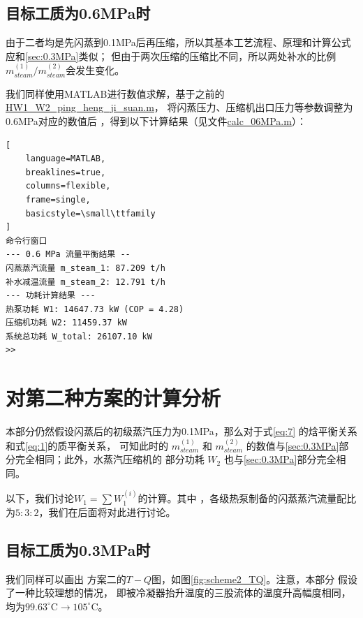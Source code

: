 \documentclass{thuemp}
\begin{document}
\subsection{目标工质为0.6MPa时}




由于二者均是先闪蒸到0.1MPa后再压缩，所以其基本工艺流程、原理和计算公式应和\ref{sec:0.3MPa}类似；
但由于两次压缩的压缩比不同，所以两处补水的比例
$m_{steam}^{(1)}/m_{steam}^{(2)}$会发生变化。

我们同样使用MATLAB进行数值求解，基于之前的\url{HW1_W2_ping_heng_ji_suan.m}，
将闪蒸压力、压缩机出口压力等参数调整为0.6MPa对应的数值后
，得到以下计算结果（见文件\url{calc_06MPa.m}）：
\begin{lstlisting}[
    language=MATLAB,
    breaklines=true,
    columns=flexible,
    frame=single,
    basicstyle=\small\ttfamily
]
命令行窗口
--- 0.6 MPa 流量平衡结果 --
闪蒸蒸汽流量 m_steam_1: 87.209 t/h
补水减温流量 m_steam_2: 12.791 t/h
--- 功耗计算结果 ---
热泵功耗 W1: 14647.73 kW (COP = 4.28)
压缩机功耗 W2: 11459.37 kW
系统总功耗 W_total: 26107.10 kW
>> 
\end{lstlisting}



\section{对第二种方案的计算分析}\label{sec:scheme2_analysis}


本部分仍然假设闪蒸后的初级蒸汽压力为0.1MPa，那么对于式\ref{eq:7}
的焓平衡关系和式\ref{eq:1}的质平衡关系，
可知此时的 $m_{steam}^{(1)}$ 和 $m_{steam}^{(2)}$ 的数值与\ref{sec:0.3MPa}部
分完全相同；此外，水蒸汽压缩机的
部分功耗 $W_2$ 也与\ref{sec:0.3MPa}部分完全相同。

以下，我们讨论$W_1=\sum W_1^{(i)}$的计算。其中
，各级热泵制备的闪蒸蒸汽流量配比为$5:3:2$，我们在后面将对此进行讨论。


\subsection{目标工质为0.3MPa时}\label{sec:scheme2_03MPa}



我们同样可以画出
方案二的$T-Q$图，如图\ref{fig:scheme2_TQ}。注意，本部分
假设了一种比较理想的情况，
即被冷凝器抬升温度的三股流体的温度升高幅度相同，
均为$99.63^\circ\mathrm{C}\rightarrow 105^\circ\mathrm{C}$。
\end{document}
